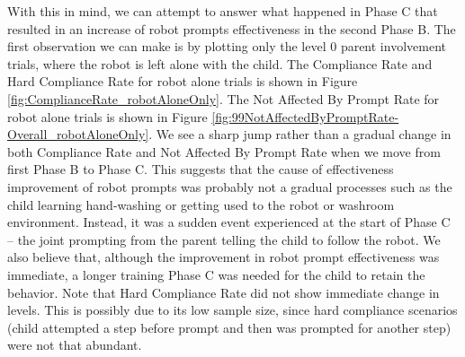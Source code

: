 With this in mind, we can attempt to answer what happened in Phase C that resulted in an increase of robot prompts effectiveness in the second Phase B.  The first observation we can make is by plotting only the level 0 parent involvement trials, where the robot is left alone with the child.  The Compliance Rate and Hard Compliance Rate for robot alone trials is shown in Figure \ref{fig:ComplianceRate_robotAloneOnly}.  The Not Affected By Prompt Rate for robot alone trials is shown in Figure \ref{fig:99NotAffectedByPromptRate-Overall_robotAloneOnly}.  We see a sharp jump rather than a gradual change in both Compliance Rate and Not Affected By Prompt Rate when we move from first Phase B to Phase C.  This suggests that the cause of effectiveness improvement of robot prompts was probably not a gradual processes such as the child learning hand-washing or getting used to the robot or washroom environment.  Instead, it was a sudden event experienced at the start of Phase C -- the joint prompting from the parent telling the child to follow the robot.  We also believe that, although the improvement in robot prompt effectiveness was immediate, a longer training Phase C was needed for the child to retain the behavior.  Note that Hard Compliance Rate did not show immediate change in levels.  This is possibly due to its low sample size, since hard compliance scenarios (child attempted a step before prompt and then was prompted for another step) were not that abundant.
